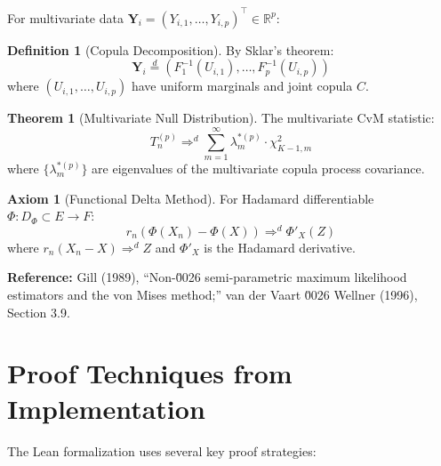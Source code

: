 \documentclass[11pt,a4paper]{amsart}
\theoremstyle{definition}
\newtheorem{definition}{Definition}[section]
\newtheorem{theorem}{Theorem}[section]
\newtheorem{axiom}{Axiom}[section]
\newcommand{\R}{\mathbb{R}}
\newcommand{\aslim}{\Rightarrow^d}
\begin{document}
For multivariate data $\mathbf{Y}_i = (Y_{i,1}, \dots, Y_{i,p})^\top \in \R^p$:

\begin{definition}[Copula Decomposition]
\label{def:copula}
By Sklar's theorem:
\begin{equation*}
\mathbf{Y}_i \stackrel{d}{=} (F_1^{-1}(U_{i,1}), \dots, F_p^{-1}(U_{i,p}))
\end{equation*}
where $(U_{i,1}, \dots, U_{i,p})$ have uniform marginals and joint copula $C$.
\end{definition}

\begin{theorem}[Multivariate Null Distribution]
\label{thm:multivariate}
The multivariate CvM statistic:
\begin{equation*}
T_n^{(p)} \aslim \sum_{m=1}^\infty \lambda_m^{*(p)} \cdot \chi^2_{K-1,m}
\end{equation*}
where $\{\lambda_m^{*(p)}\}$ are eigenvalues of the multivariate copula process covariance.
\end{theorem}

\begin{axiom}[Functional Delta Method]
\label{ax:delta-method}
For Hadamard differentiable $\Phi: D_\Phi \subset E \to F$:
\begin{equation*}
r_n(\Phi(X_n) - \Phi(X)) \aslim \Phi'_X(Z)
\end{equation*}
where $r_n(X_n - X) \aslim Z$ and $\Phi'_X$ is the Hadamard derivative.

\textbf{Reference:} Gill (1989), ``Non-\u0026 semi-parametric maximum likelihood estimators 
and the von Mises method;'' van der Vaart \u0026 Wellner (1996), Section 3.9.
\end{axiom}

\section{Proof Techniques from Implementation}
\label{sec:proofs}

The Lean formalization uses several key proof strategies:
\end{document}
